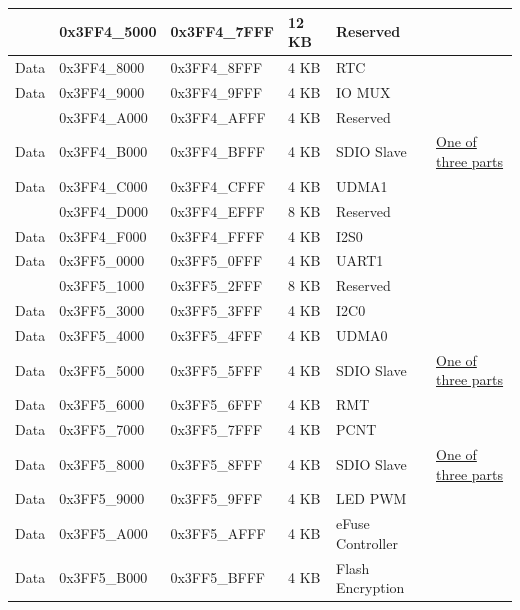 \begin{longtable}[c]{ |p{1.5cm}|p{3cm}|p{3cm}|p{1.5cm}|p{3cm}|p{3cm}| }
    \rowcolor{gray!25}
    & 0x3FF4\_5000 & 0x3FF4\_7FFF & 12 KB & Reserved & \\
    
    \hline
    Data & 0x3FF4\_8000 & 0x3FF4\_8FFF & 4 KB & RTC & \\
    \hline
    Data & 0x3FF4\_9000 & 0x3FF4\_9FFF & 4 KB & IO MUX & \\
    \hline
    
    \rowcolor{gray!25}
    & 0x3FF4\_A000 & 0x3FF4\_AFFF & 4 KB & Reserved & \\
    
    \hline
    Data & 0x3FF4\_B000 & 0x3FF4\_BFFF & 4 KB & SDIO Slave & \hyperlink{SDIO_Slave_split_three_part}{One of three parts} \\
    \hline
    Data & 0x3FF4\_C000 & 0x3FF4\_CFFF & 4 KB & UDMA1 & \\
    \hline
    
    \rowcolor{gray!25}
    & 0x3FF4\_D000 & 0x3FF4\_EFFF & 8 KB & Reserved & \\
    
    \hline
    Data & 0x3FF4\_F000 & 0x3FF4\_FFFF & 4 KB & I2S0 & \\
    \hline
    Data & 0x3FF5\_0000 & 0x3FF5\_0FFF & 4 KB & UART1 & \\
    \hline
    
    \rowcolor{gray!25}
    & 0x3FF5\_1000 & 0x3FF5\_2FFF & 8 KB & Reserved & \\
    
    \hline
    Data & 0x3FF5\_3000 & 0x3FF5\_3FFF & 4 KB & I2C0 & \\
    \hline
    Data & 0x3FF5\_4000 & 0x3FF5\_4FFF & 4 KB & UDMA0 & \\
    \hline
    Data & 0x3FF5\_5000 & 0x3FF5\_5FFF & 4 KB & SDIO Slave & \hyperlink{SDIO_Slave_split_three_part}{One of three parts} \\
    \hline
    Data & 0x3FF5\_6000 & 0x3FF5\_6FFF & 4 KB & RMT & \\
    \hline
    Data & 0x3FF5\_7000 & 0x3FF5\_7FFF & 4 KB & PCNT & \\
    \hline
    Data & 0x3FF5\_8000 & 0x3FF5\_8FFF & 4 KB & SDIO Slave & \hyperlink{SDIO_Slave_split_three_part}{One of three parts} \\
    \hline
    Data & 0x3FF5\_9000 & 0x3FF5\_9FFF & 4 KB & LED PWM & \\
    \hline
    Data & 0x3FF5\_A000 & 0x3FF5\_AFFF & 4 KB & eFuse Controller & \\
    \hline
    Data & 0x3FF5\_B000 & 0x3FF5\_BFFF & 4 KB & Flash Encryption & \\
    \hline
    

\end{longtable}
